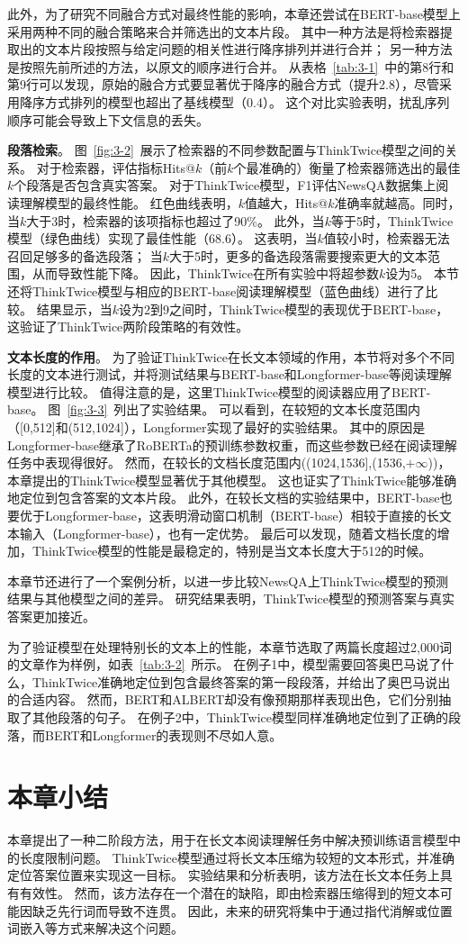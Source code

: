 此外，为了研究不同融合方式对最终性能的影响，本章还尝试在BERT-base模型上采用两种不同的融合策略来合并筛选出的文本片段。
其中一种方法是将检索器提取出的文本片段按照与给定问题的相关性进行降序排列并进行合并；
另一种方法是按照先前所述的方法，以原文的顺序进行合并。
从表格~\ref{tab:3-1}~中的第8行和第9行可以发现，原始的融合方式要显著优于降序的融合方式（提升2.8），尽管采用降序方式排列的模型也超出了基线模型（0.4）。
这个对比实验表明，扰乱序列顺序可能会导致上下文信息的丢失。

\textbf{段落检索}。
图~\ref{fig:3-2}~展示了检索器的不同参数配置与ThinkTwice模型之间的关系。
对于检索器，评估指标Hits@$k$（前$k$个最准确的）衡量了检索器筛选出的最佳$k$个段落是否包含真实答案。
对于ThinkTwice模型，F1评估NewsQA数据集上阅读理解模型的最终性能。
红色曲线表明，$k$值越大，Hits@$k$准确率就越高。同时，当$k$大于3时，检索器的该项指标也超过了90\%。
此外，当$k$等于5时，ThinkTwice模型（绿色曲线）实现了最佳性能（68.6）。
这表明，当$k$值较小时，检索器无法召回足够多的备选段落；
当$k$大于5时，更多的备选段落需要搜索更大的文本范围，从而导致性能下降。
因此，ThinkTwice在所有实验中将超参数$k$设为5。
本节还将ThinkTwice模型与相应的BERT-base阅读理解模型（蓝色曲线）进行了比较。
结果显示，当$k$设为2到9之间时，ThinkTwice模型的表现优于BERT-base，这验证了ThinkTwice两阶段策略的有效性。



\textbf{文本长度的作用}。
为了验证ThinkTwice在长文本领域的作用，本节将对多个不同长度的文本进行测试，并将测试结果与BERT-base和Longformer-base等阅读理解模型进行比较。
值得注意的是，这里ThinkTwice模型的阅读器应用了BERT-base。
图~\ref{fig:3-3}~列出了实验结果。
可以看到，在较短的文本长度范围内（[0,512]和(512,1024]），Longformer实现了最好的实验结果。
其中的原因是Longformer-base继承了RoBERTa的预训练参数权重，而这些参数已经在阅读理解任务中表现得很好。
然而，在较长的文档长度范围内((1024,1536],(1536,$+\infty$))，本章提出的ThinkTwice模型显著优于其他模型。
这也证实了ThinkTwice能够准确地定位到包含答案的文本片段。
此外，在较长文档的实验结果中，BERT-base也要优于Longformer-base，这表明滑动窗口机制（BERT-base）相较于直接的长文本输入（Longformer-base），也有一定优势。
最后可以发现，随着文档长度的增加，ThinkTwice模型的性能是最稳定的，特别是当文本长度大于512的时候。



本章节还进行了一个案例分析，以进一步比较NewsQA上ThinkTwice模型的预测结果与其他模型之间的差异。
研究结果表明，ThinkTwice模型的预测答案与真实答案更加接近。

为了验证模型在处理特别长的文本上的性能，本章节选取了两篇长度超过2,000词的文章作为样例，如表~\ref{tab:3-2}~所示。
在例子1中，模型需要回答奥巴马说了什么，ThinkTwice准确地定位到包含最终答案的第一段段落，并给出了奥巴马说出的合适内容。
然而，BERT和ALBERT却没有像预期那样表现出色，它们分别抽取了其他段落的句子。
在例子2中，ThinkTwice模型同样准确地定位到了正确的段落，而BERT和Longformer的表现则不尽如人意。



\section{本章小结}
本章提出了一种二阶段方法，用于在长文本阅读理解任务中解决预训练语言模型中的长度限制问题。
ThinkTwice模型通过将长文本压缩为较短的文本形式，并准确定位答案位置来实现这一目标。
实验结果和分析表明，该方法在长文本任务上具有有效性。
然而，该方法存在一个潜在的缺陷，即由检索器压缩得到的短文本可能因缺乏先行词而导致不连贯。
因此，未来的研究将集中于通过指代消解或位置词嵌入等方式来解决这个问题。


